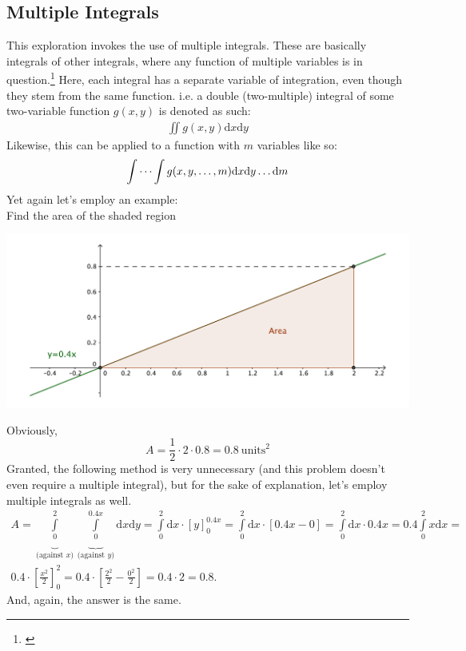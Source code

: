\subsection{Multiple Integrals}
This exploration invokes the use of multiple integrals. These are basically integrals of other integrals, where any function of multiple variables is in question.\footnote{\cite{stewart_2008_int}} Here, each integral has a separate variable of integration, even though they stem from the same function. i.e. a double (two-multiple) integral of some two-variable function $g(x,y)$ is denoted as such:
\begin{gather*}
\iint g(x,y) \mathrm{d}x\mathrm{d}y
\end{gather*}
Likewise, this can be applied to a function with $m$ variables like so:
\begin{gather*}
\idotsint g(x,y,\dots,m) \mathrm{d}x\mathrm{d}y \dots \mathrm{d}m
\end{gather*}
Yet again let's employ an example: \\
Find the area of the shaded region\\
\begin{center}
\includegraphics[scale=0.4]{pic-multiexample}
\end{center}
Obviously, $$A=\frac{1}{2}\cdot 2 \cdot 0.8 = 0.8 \ \text{units}^{2}$$ Granted, the following method is very unnecessary (and this problem doesn't even require a multiple integral), but for the sake of explanation, let's employ multiple integrals as well.
\begin{gather*}
A = \underbrace{\int\limits_{0}^{2}}_{\text{(against } x\text{)}} \underbrace{\int\limits_{0}^{0.4x}}_{\text{(against } y\text{)}} \mathrm{d}x \mathrm{d}y =  \int\limits_{0}^{2} \mathrm{d}x \cdot \left[ y \right]_{0}^{0.4x} =  \int\limits_{0}^{2} \mathrm{d}x \cdot  \left[ 0.4x - 0 \right] = \int\limits_{0}^{2} \mathrm{d}x \cdot 0.4x = 0.4 \int\limits_{0}^{2} x\mathrm{d}x = \\
0.4 \cdot \left[ \frac{x^{2}}{2} \right]_{0}^{2} = 0.4 \cdot \left[ \frac{2^{2}}{2} - \frac{0^{2}}{2} \right] = 0.4 \cdot 2 = 0.8.
\end{gather*}
And, again, the answer is the same.
